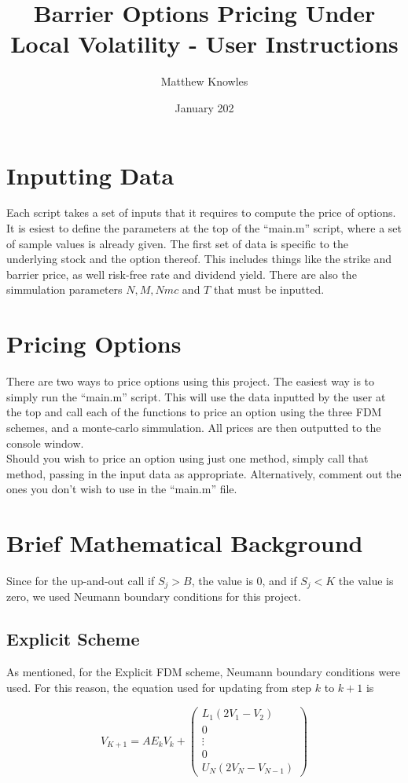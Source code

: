 \documentclass[11pt]{article}
\title{Barrier Options Pricing Under Local Volatility - User Instructions}
\author{Matthew Knowles}
\date{January 202}
\begin{document}
\maketitle

\section{Inputting Data}
Each script takes a set of inputs that it requires to compute the price of options. It is esiest to define the parameters at the top of 
the ``main.m'' script, where a set of sample values is already given. The first set of data is specific to the underlying stock and the 
option thereof. This includes things like the strike and barrier price, as well risk-free rate and dividend yield. There are also the simmulation parameters $N, M, Nmc$ and $T$ that must be inputted.

\section{Pricing Options}
There are two ways to price options using this project. The easiest way is to simply run the ``main.m'' script. This will use the data inputted by the user at the top
and call each of the functions to price an option using the three FDM schemes, and a monte-carlo simmulation. All prices are then outputted to the 
console window. \\

Should you wish to price an option using just one method, simply call that method, passing in the input data as appropriate. Alternatively, 
comment out the ones you don't wish to use in the ``main.m'' file. 

\section{Brief Mathematical Background}

Since for the up-and-out call if $S_j>B$, the value is 0, and if $S_j<K$ the value is zero, we used Neumann boundary conditions for this project. 

\subsection{Explicit Scheme}
As mentioned, for the Explicit FDM scheme, Neumann boundary conditions were used. For this reason, the equation used for updating from step $k$ to $k+1$ is 

\[
    V_{K+1} = AE_k V_k + 
    \begin{pmatrix}
        L_1(2V_1-V_2) \\
        0 \\
        \vdots \\
        0\\
        U_N(2V_N-V_{N-1})
    \end{pmatrix}
\]
\end{document}
